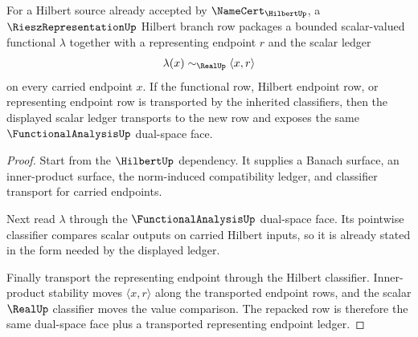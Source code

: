 \begin{theorem}
\label{thm:rieszrepresentation-hilbert-functional-bridge}
For a Hilbert source already accepted by $\NameCert_{\HilbertUp}$, a $\RieszRepresentationUp$ Hilbert branch row packages a bounded scalar-valued functional $\lambda$ together with a representing endpoint $r$ and the scalar ledger
$$
\lambda(x) \sim_{\RealUp} \langle x,r\rangle
$$
on every carried endpoint $x$. If the functional row, Hilbert endpoint row, or representing endpoint row is transported by the inherited classifiers, then the displayed scalar ledger transports to the new row and exposes the same $\FunctionalAnalysisUp$ dual-space face.
\end{theorem}
\begin{proof}
Start from the $\HilbertUp$ dependency. It supplies a Banach surface, an inner-product surface, the norm-induced compatibility ledger, and classifier transport for carried endpoints.

Next read $\lambda$ through the $\FunctionalAnalysisUp$ dual-space face. Its pointwise classifier compares scalar outputs on carried Hilbert inputs, so it is already stated in the form needed by the displayed ledger.

Finally transport the representing endpoint through the Hilbert classifier. Inner-product stability moves $\langle x,r\rangle$ along the transported endpoint rows, and the scalar $\RealUp$ classifier moves the value comparison. The repacked row is therefore the same dual-space face plus a transported representing endpoint ledger.
\end{proof}

